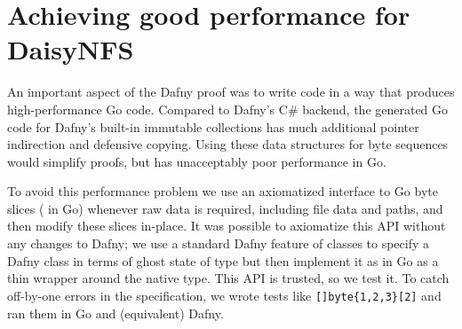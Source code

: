 \begin{comment}
begin
    rm -rf src-compiled
    for file in src/*/**.dfy
        set -l path (string sub --start 4 $file)
        set -l dir (dirname $path)
        mkdir -p src-compiled/$dir
        dafny /printMode:NoGhost /dafnyVerify:0 /rprint:src-compiled/$path $file &
    end
    wait
    cloc --read-lang-def ~/dafny-lang.txt src-compiled
    cloc --read-lang-def ~/dafny-lang.txt src
end
\end{comment}



\begin{comment}
begin
    gsed -n '/method[^(]* [A-Z]*(/,/^\s*{/p' src/fs/dir_fs.dfy
    cat src/fs/nfs.s.dfy
end | wc -l
\end{comment}
%


\section{Achieving good performance for DaisyNFS}
\label{sec:impl:dafny-perf}

An important aspect of the Dafny proof was to write code in a way that produces
high-performance Go code.
Compared to Dafny's C\# backend, the generated Go code for Dafny's built-in
immutable collections has much
additional pointer indirection and defensive copying. Using these data
structures for byte sequences would simplify proofs, but has unacceptably poor
performance in Go.

To avoid this performance problem we use an axiomatized interface to
Go byte slices ( in Go) whenever raw data is required, including file
data and paths, and then modify these slices in-place. It was possible to
axiomatize this API without any changes to Dafny; we use a standard Dafny
feature of  classes to specify a Dafny class  in terms of
ghost state of type  but then implement it as in Go as a thin
wrapper around the native  type. This API is trusted, so we
test it. To catch off-by-one errors in the specification, we wrote
tests like \verb![]byte{1,2,3}[2]! and ran them in Go and
(equivalent) Dafny.

